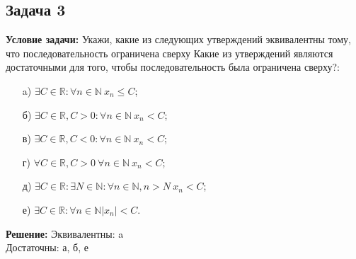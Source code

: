 \documentclass[a4paper,12pt]{article}
\begin{document}
\vspace{1cm}

\subsection{Задача 3}
\textbf{Условие задачи:}
Укажи, какие из следующих утверждений эквивалентны тому, что последовательность ограничена сверху Какие из утверждений являются достаточными для того, чтобы последовательность
была ограничена сверху?:
\begin{itemize}
    \item[a)] \( \exists C \in \mathbb{R} : \forall n \in \mathbb{N} \ x_n \leq C \);
    \item[б)] \( \exists C \in \mathbb{R}, C > 0 : \forall n \in \mathbb{N} \ x_n < C \);
    \item[в)] \( \exists C \in \mathbb{R}, C < 0 : \forall n \in \mathbb{N} \ x_n < C \);
    \item[г)] \( \forall C \in \mathbb{R}, C > 0 \ \forall n \in \mathbb{N} \ x_n < C \);
    \item[д)] \( \exists C \in \mathbb{R} : \exists N \in \mathbb{N} : \forall n \in \mathbb{N}, n > N \ x_n < C \);
    \item[е)] \( \exists C \in \mathbb{R} : \forall n \in \mathbb{N} |x_n| < C \).
\end{itemize}

\vspace{1cm}
\textbf{Решение:}
Эквивалентны: a\\
Достаточны: а, б, е
\end{document}
